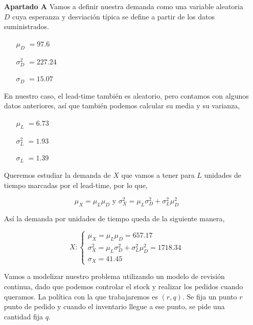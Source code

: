 \documentclass[a4paper,12pt]{article}
\begin{document}
\begin{itemize}

\item[\textbf{Apartado A}
]
Vamos a definir nuestra demanda como una variable aleatoria $D$ cuya esperanza y desviaci\'on t\'ipica se define a partir de los datos suministrados.

\begin{itemize}
\item[] \textbf{$\mu_D$} $= 97.6$
\item[] \textbf{$\sigma_D^2$} $= 227.24$
\item[] \textbf{$\sigma_D$} $= 15.07$
\end{itemize}

En nuestro caso, el lead-time tambi\'en es aleatorio, pero contamos con algunos datos anteriores, as\'i que tambi\'en podemos calcular su media y su varianza,

\begin{itemize}
\item[] \textbf{$\mu_L$} $= 6.73$
\item[] \textbf{$\sigma_L^2$} $= 1.93$
\item[] \textbf{$\sigma_L$} $= 1.39$
\end{itemize}

Queremos estudiar la demanda de $X$ que vamos a tener para $L$ unidades de tiempo marcadas por el lead-time, por lo que,

$$\mu_X = \mu_L \mu_D \text{ y } \sigma_X^2 = \mu_L \sigma_D^2 + \sigma_L^2 \mu_D^2$$

As\'i la demanda por unidades de tiempo queda de la siguiente manera,


	\begin{equation*}
	X:  \left\lbrace \begin{array}{l}
		\mu_X = \mu_L \mu_D = 657.17\\
		\sigma_X^2 = \mu_L \sigma_D^2 + \sigma_L^2 \mu_D^2 = 1718.34\\
		\sigma_X = 41.45
	\end{array}
	\right. 
	\end{equation*}

Vamos a modelizar nuestro problema utilizando un modelo de revisi\'on continua, dado que podemos controlar el stock y realizar los pedidos cuando queramos. La pol\'itica con la que trabajaremos es $(r, q)$. Se fija un punto $r$ punto de pedido y cuando el inventario llegue a ese punto, se pide una cantidad fija $q$. \\


\end{itemize}
\end{document}
